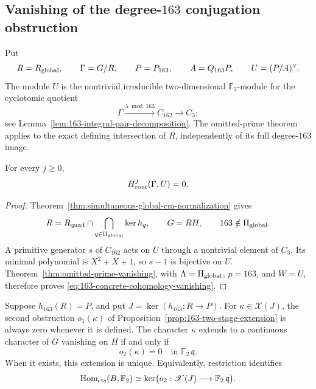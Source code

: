 \subsection{Vanishing of the degree-\(163\) conjugation obstruction}
\label{sec:163-concrete-odd-inertia}

Put
\[
 R=R_{\rm global},\qquad \Gamma=G/R,\qquad
 P=P_{163},\qquad A=Q_{163}P,\qquad U=(P/A)^\vee.
\]
The module \(U\) is the nontrivial irreducible two-dimensional
\(\mathbb F_2\)-module for the cyclotomic quotient
\[
 \Gamma\xrightarrow{\lambda\bmod163}C_{162}\longrightarrow C_3;
\]
see Lemma~\ref{lem:163-integral-pair-decomposition}.
The omitted-prime theorem applies to the exact defining
intersection of \(R\), independently of its full degree-\(163\) image.

\begin{theorem}\label{thm:163-concrete-odd-inertia}
For every \(j\ge0\),
\begin{equation}
                         H^j_{\rm cont}(\Gamma,U)=0.
 \label{eq:163-concrete-cohomology-vanishing}
\end{equation}
\end{theorem}

\begin{proof}
Theorem~\ref{thm:simultaneous-global-cm-normalization} gives
\[
 R=R_{\rm quad}\cap
       \bigcap_{q\in\Pi_{\rm global}}\ker h_q,\qquad
 G=RH,\qquad 163\notin\Pi_{\rm global}.
\]
A primitive generator \(s\) of \(C_{162}\) acts on \(U\)
through a nontrivial element of \(C_3\).
Its minimal polynomial is \(X^2+X+1\), so \(s-1\) is
bijective on \(U\).
Theorem~\ref{thm:omitted-prime-vanishing}, with
\(\Lambda=\Pi_{\rm global}\), \(p=163\), and \(W=U\),
therefore proves
\eqref{eq:163-concrete-cohomology-vanishing}.
\end{proof}

\begin{corollary}\label{cor:163-single-extension-obstruction}
Suppose \(h_{163}(R)=P\), and put
\(J=\ker(h_{163}:R\to P)\).
For \(\kappa\in\mathscr X(J)\), the second obstruction
\(o_1(\kappa)\) of
Proposition~\ref{prop:163-two-stage-extension} is always
zero whenever it is defined.
The character \(\kappa\) extends to a continuous
character of \(G\) vanishing on \(H\) if and only if
\[
                   o_2(\kappa)=0
                       \quad\text{in }\mathbb F_2\,\mathfrak q.
\]
When it exists, this extension is unique.
Equivalently, restriction identifies
\begin{equation}
 \operatorname{Hom}_{\rm cts}(B,\mathbb F_2)
   \simeq
 \ker\bigl(o_2:\mathscr X(J)\longrightarrow
                               \mathbb F_2\,\mathfrak q\bigr).
 \label{eq:163-remaining-relative-obstruction}
\end{equation}
\end{corollary}

